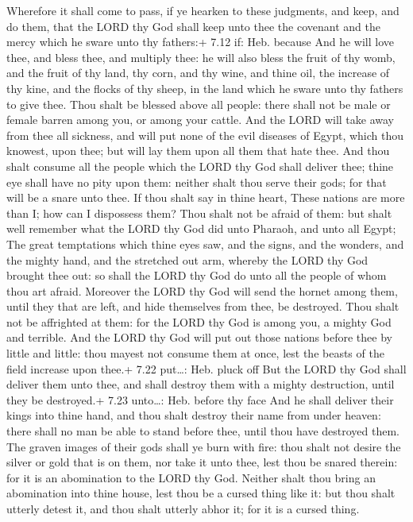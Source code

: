  Wherefore it shall come to pass, if ye hearken to these
judgments, and keep, and do them, that the LORD thy God shall keep unto
thee the covenant and the mercy which he sware unto thy fathers:+ 7.12
if: Heb. because  And he will love thee, and bless thee,
and multiply thee: he will also bless the fruit of thy womb, and the
fruit of thy land, thy corn, and thy wine, and thine oil, the increase
of thy kine, and the flocks of thy sheep, in the land which he sware
unto thy fathers to give thee.  Thou shalt be blessed above
all people: there shall not be male or female barren among you, or among
your cattle.  And the LORD will take away from thee all
sickness, and will put none of the evil diseases of Egypt, which thou
knowest, upon thee; but will lay them upon all them that hate thee.
 And thou shalt consume all the people which the LORD thy
God shall deliver thee; thine eye shall have no pity upon them: neither
shalt thou serve their gods; for that will be a snare unto thee.
 If thou shalt say in thine heart, These nations are more
than I; how can I dispossess them?  Thou shalt not be
afraid of them: but shalt well remember what the LORD thy God did unto
Pharaoh, and unto all Egypt;  The great temptations which
thine eyes saw, and the signs, and the wonders, and the mighty hand, and
the stretched out arm, whereby the LORD thy God brought thee out: so
shall the LORD thy God do unto all the people of whom thou art afraid.
 Moreover the LORD thy God will send the hornet among them,
until they that are left, and hide themselves from thee, be destroyed.
 Thou shalt not be affrighted at them: for the LORD thy God
is among you, a mighty God and terrible.  And the LORD thy
God will put out those nations before thee by little and little: thou
mayest not consume them at once, lest the beasts of the field increase
upon thee.+ 7.22 put\ldots: Heb. pluck off  But the LORD
thy God shall deliver them unto thee, and shall destroy them with a
mighty destruction, until they be destroyed.+ 7.23 unto\ldots: Heb.
before thy face  And he shall deliver their kings into
thine hand, and thou shalt destroy their name from under heaven: there
shall no man be able to stand before thee, until thou have destroyed
them.  The graven images of their gods shall ye burn with
fire: thou shalt not desire the silver or gold that is on them, nor take
it unto thee, lest thou be snared therein: for it is an abomination to
the LORD thy God.  Neither shalt thou bring an abomination
into thine house, lest thou be a cursed thing like it: but thou shalt
utterly detest it, and thou shalt utterly abhor it; for it is a cursed
thing.

